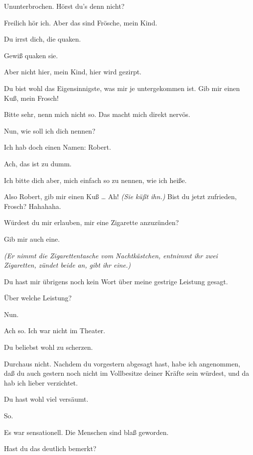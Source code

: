 \documentclass[
	final,
	a4paper,
	ngerman,
	mpinclude = true, %
	twoside = true,
	open = right,
	cleardoublepage = plain,
	DIV = 13,
	BCOR = 1cm,
	titlepage = firstiscover,
	]{scrbook}
\newcommand{\direction}[1]{\textit{(#1)}}
\newcommand{\thecharacter}[1]{\textup{\textsc{#1}}}
\newcommand{\thedichter}{\thecharacter{Dichter}}
\newcommand{\theschauspielerin}{\thecharacter{Schauspielerin}}
\newcommand{\character}[1]{\item[#1:]}
\newcommand{\dichter}{\character{\thedichter}}
\newcommand{\schauspielerin}{\character{\theschauspielerin}}
\begin{document}
\begin{play}
	\dichter
	Ununterbrochen. Hörst du's denn nicht?

	\schauspielerin
	Freilich hör ich. Aber das sind Frösche, mein Kind.

	\dichter
	Du irrst dich, die quaken.

	\schauspielerin
	Gewiß quaken sie.

	\dichter
	Aber nicht hier, mein Kind, hier wird gezirpt.

	\schauspielerin
	Du bist wohl das Eigensinnigste, was mir je untergekommen ist. Gib mir einen Kuß, mein Frosch!

	\dichter
	Bitte sehr, nenn mich nicht so. Das macht mich direkt nervös.

	\schauspielerin
	Nun, wie soll ich dich nennen?

	\dichter
	Ich hab doch einen Namen: Robert.

	\schauspielerin
	Ach, das ist zu dumm.

	\dichter
	Ich bitte dich aber, mich einfach so zu nennen, wie ich heiße.

	\schauspielerin
	Also Robert, gib mir einen Kuß \ldots{} Ah! \direction{Sie küßt ihn.} Bist du jetzt zufrieden, Frosch? Hahahaha.

	\dichter
	Würdest du mir erlauben, mir eine Zigarette anzuzünden?

	\schauspielerin
	Gib mir auch eine.

	\direction{Er nimmt die Zigarettentasche vom Nachtkästchen, entnimmt ihr zwei Zigaretten, zündet beide an, gibt ihr eine.}

	\schauspielerin
	Du hast mir übrigens noch kein Wort über meine gestrige Leistung gesagt.

	\dichter
	Über welche Leistung?

	\schauspielerin
	Nun.

	\dichter
	Ach so. Ich war nicht im Theater.

	\schauspielerin
	Du beliebst wohl zu scherzen.

	\dichter
	Durchaus nicht. Nachdem du vorgestern abgesagt hast, habe ich angenommen, daß du auch gestern noch nicht im Vollbesitze deiner Kräfte sein würdest, und da hab ich lieber verzichtet.

	\schauspielerin
	Du hast wohl viel versäumt.

	\dichter
	So.

	\schauspielerin
	Es war sensationell. Die Menschen sind blaß geworden.

	\dichter
	Hast du das deutlich bemerkt?


\end{play}
\end{document}
